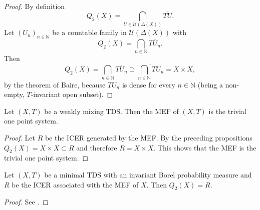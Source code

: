   \begin{proof}
    By definition
    \begin{equation*}
      Q_2 (X) = \bigcap_{U \in \mathcal{U}(\Delta (X))} \overline{TU}.
    \end{equation*}
    Let $(U_n)_{n \in \mathbb{N}}$ be a countable family in $\mathcal{U}(\Delta (X))$ with 
    \begin{equation*}
      Q_2 (X) =\bigcap_{n \in \mathbb{N}} \overline{TU_n}.
    \end{equation*}
    Then
\begin{equation*}
      Q_2 (X) =\bigcap_{n \in \mathbb{N}} \overline{TU_n} \supset 
  \overline{\bigcap_{n \in \mathbb{N}} TU_n } = X \times X,
    \end{equation*}
    by the theorem of Baire, because $TU_n$ is dense for every $n \in \mathbb{N}$ (being a non-empty, $T$-invariant open subset).
  \end{proof}
  \begin{corollary}
    Let $(X,T)$ be a weakly mixing TDS. Then the MEF of $(X,T)$ is the trivial one point system.
  \end{corollary}
  \begin{proof}
    Let $R$ be the ICER generated by the MEF.
    By the preceding propositions $Q_2 (X) = X\times X \subset R$ and therefore $R = X \times X$.
    This shows that the MEF is the trivial one point system.
  \end{proof}
\begin{theorem}
  Let $(X, T)$ be a minimal TDS with an invariant Borel probability measure
  and $R$ be the ICER associated with the MEF of $X$.
  Then $Q_2(X) = R$.
\end{theorem}

\begin{proof}
  See \cite[p.130, Thm. 8.]{Auslaner}.
\end{proof}

